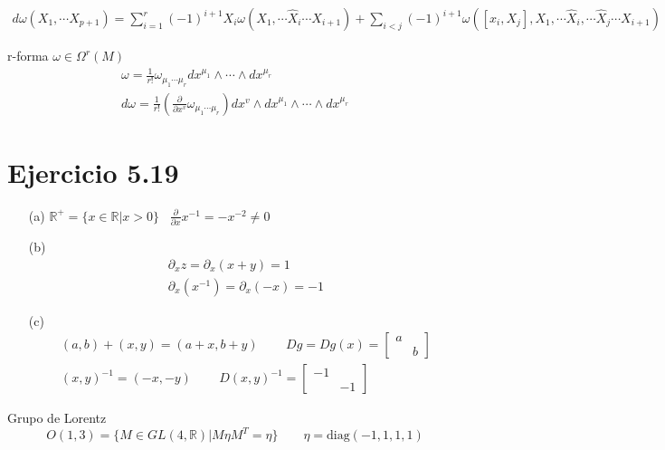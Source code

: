 \documentclass{article}
\begin{document}
\begin{gather*}
  d\omega (X_1, \cdots X _{p+1 } ) = \displaystyle\sum_{i=1 }^{r }(-1) ^ {i + 1 } X_i \omega (X_1, \cdots \hat X_i \cdots X _{i+1 } ) + \displaystyle\sum_{i<j }^{} (-1)^ {i + 1 } \omega ([x_i, X_j], X_1, \cdots \hat X_i, \cdots \hat X_j \cdots X _{i + 1} ) 
\end{gather*}

r-forma $ \omega \in \Omega^r(M) $ 
\begin{gather*}
  \omega = \frac{1}{r! } \omega_{\mu_1 \cdots \mu_r } dx ^ {\mu_1 }\land \cdots \land dx ^ {\mu_r }\\
  d\omega = \frac{1}{r! }\left(\frac{\partial  }{\partial x^v }\omega _{\mu_1 \cdots \mu_r } \right) dx ^ {v }\land dx ^ {\mu_1 } \land \cdots \land dx ^ {\mu_r }
\end{gather*}




\section{Ejercicio 5.19 }
\begin{enumerate}
\item[(a)] $\mathbb{R}^+ = \lbrace x \in \mathbb{R} | x > 0 \rbrace$ \quad \quad \, $\frac{ \partial }{ \partial x} x^{-1} = -x^{-2} \neq 0 $ \, 

\item[(b)] 
\[
\begin{gathered}
\partial_x z  = \partial_x ( x+y)  = 1   \\
\partial_x( x^{-1} ) = \partial_x (-x) = -1 
\end{gathered}
\] \quad 
\item[(c)] \[
\begin{gathered}
  (a,b) + (x,y) = (a+x, b+y) \quad \quad \, Dg =Dg(x) = \left[ \begin{matrix} a & \\ & b \end{matrix} \right] \\
  (x,y)^{-1} = (-x, -y) \quad \quad \, D(x,y)^{-1} = \left[ \begin{matrix} -1 & \\ & -1 \end{matrix} \right]
\end{gathered}
\]
\end{enumerate}

Grupo de Lorentz
\[
O(1,3) = \lbrace M \in GL(4,\mathbb{R}) | M \eta M^T = \eta \rbrace  \quad \quad \eta = \text{diag}{ ( -1, 1, 1, 1 ) }
\]
\end{document}
